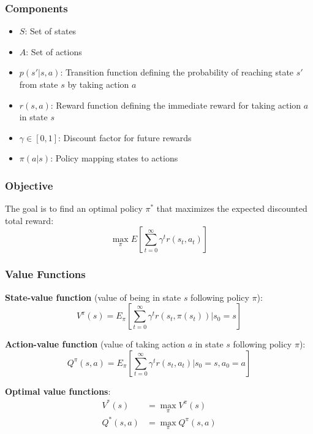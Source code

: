 \documentclass{article}
\begin{document}
\subsubsection{Components}
\begin{itemize}
    \item $S$: Set of states
    \item $A$: Set of actions
    \item $p(s'|s,a)$: Transition function defining the probability of reaching state $s'$ from state $s$ by taking action $a$
    \item $r(s,a)$: Reward function defining the immediate reward for taking action $a$ in state $s$
    \item $\gamma \in [0,1]$: Discount factor for future rewards
    \item $\pi(a|s)$: Policy mapping states to actions
\end{itemize}

\subsubsection{Objective}
The goal is to find an optimal policy $\pi^*$ that maximizes the expected discounted total reward:
\begin{equation}
    \max_\pi E\left[\sum_{t=0}^{\infty} \gamma^t r(s_t, a_t)\right]
\end{equation}

\subsubsection{Value Functions}
\textbf{State-value function} (value of being in state $s$ following policy $\pi$):
\begin{equation}
    V^\pi(s) = E_\pi\left[\sum_{t=0}^{\infty} \gamma^t r(s_t, \pi(s_t)) | s_0 = s\right]
\end{equation}

\textbf{Action-value function} (value of taking action $a$ in state $s$ following policy $\pi$):
\begin{equation}
    Q^\pi(s,a) = E_\pi\left[\sum_{t=0}^{\infty} \gamma^t r(s_t, a_t) | s_0 = s, a_0 = a\right]
\end{equation}

\textbf{Optimal value functions}:
\begin{align}
    V^*(s) &= \max_\pi V^\pi(s) \\
    Q^*(s,a) &= \max_\pi Q^\pi(s,a)
\end{align}
\end{document}

